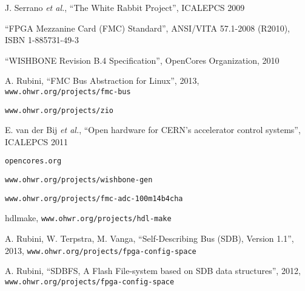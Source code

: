 \documentclass{JAC2003}
\begin{document}
\begin{thebibliography}{99} %

J. Serrano \textit{et al.}, ``The White Rabbit Project'', ICALEPCS 2009

``FPGA Mezzanine Card (FMC) Standard'', ANSI/VITA 57.1-2008 (R2010), ISBN 1-885731-49-3

``WISHBONE Revision B.4 Specification'', OpenCores Organization, 2010

A. Rubini, ``FMC Bus Abstraction for Linux'', 2013, \texttt{www.ohwr.org/projects/fmc-bus}

\texttt{www.ohwr.org/projects/zio}

E. van der Bij \textit{et al.}, ``Open hardware for CERN's accelerator control systems'', ICALEPCS 2011

\texttt{opencores.org}


\texttt{www.ohwr.org/projects/wishbone-gen}

\texttt{www.ohwr.org/projects/fmc-adc-100m14b4cha}

hdlmake, \texttt{www.ohwr.org/projects/hdl-make}

A. Rubini, W. Terpstra, M. Vanga, ``Self-Describing Bus (SDB), Version 1.1'', 2013, \texttt{www.ohwr.org/projects/fpga-config-space}

A. Rubini, ``SDBFS, A Flash File-system based on SDB data structures'', 2012, \texttt{www.ohwr.org/projects/fpga-config-space}

\end{thebibliography}
\end{document}
